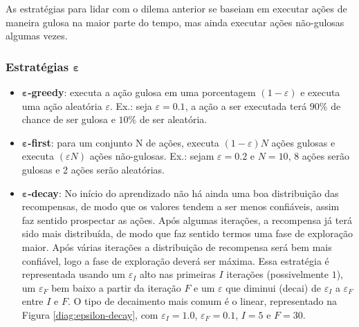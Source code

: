\documentclass{article}
\begin{document}
            As estratégias para lidar com o dilema anterior se baseiam em executar ações de maneira gulosa na maior parte do tempo, mas ainda executar ações não-gulosas algumas vezes.
        
            \subsubsection{Estratégias $\boldsymbol\varepsilon$}
            
                \begin{itemize}
                    \item \textbf{$\boldsymbol\varepsilon$-greedy}: executa a ação gulosa em uma porcentagem $(1-\varepsilon)$ e executa uma ação aleatória $\varepsilon$. Ex.: seja $\varepsilon = 0.1$, a ação a ser executada terá $90\%$ de chance de ser gulosa e $10\%$ de ser aleatória.
                    \item \textbf{$\boldsymbol\varepsilon$-first}: para um conjunto N de ações, executa $(1 - \varepsilon)N$ ações gulosas e executa $(\varepsilon N)$ ações não-gulosas. Ex.: sejam $\varepsilon = 0.2$ e $N = 10$, 8 ações serão gulosas e 2 ações serão aleatórias.
                    \item \textbf{$\boldsymbol\varepsilon$-decay}: No início do aprendizado não há ainda uma boa distribuição das recompensas, de modo que os valores tendem a ser menos confiáveis, assim faz sentido prospectar as ações. Após algumas iterações, a recompensa já terá sido mais distribuída, de modo que faz sentido termos uma fase de exploração maior. Após várias iterações a distribuição de recompensa será bem mais confiável, logo a fase de exploração deverá ser máxima. Essa estratégia é representada usando um $\varepsilon_{I}$ alto nas primeiras $I$ iterações (possivelmente $1$), um $\varepsilon_{F}$ bem baixo a partir da iteração $F$ e um $\varepsilon$ que diminui (decai) de $\varepsilon_{I}$ a $\varepsilon_{F}$ entre $I$ e $F$. O tipo de decaimento mais comum é o linear, representado na Figura \ref{diag:epsilon-decay}, com $\varepsilon_{I} = 1.0$, $\varepsilon_{F} = 0.1$, $I = 5$ e $F = 30$.
                    

\end{itemize}
\end{document}
